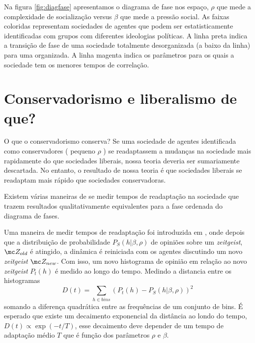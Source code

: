 Na figura \ref{fig:diagfase} apresentamos o diagrama de fase nos espaço, $\rho$
que mede a complexidade de socialização versus $\beta$ que mede a pressão
social. As faixas coloridas representam sociedades de agentes que podem ser
estatisticamente identificadas com grupos com diferentes ideologias políticas. A
linha preta indica a transição de fase de uma sociedade totalmente
desorganizada (a baixo da linha) para uma organizada. A linha magenta indica os
parâmetros para os quais a sociedade tem os menores tempos de correlação. 


\newpage
\section{Conservadorismo e liberalismo de que?} %


O que o conservadorismo conserva? Se uma sociedade de agentes identificada como
conservadores ( pequeno $\rho$ ) se readaptassem a mudanças na sociedade mais
rapidamente do que sociedades liberais, nossa teoria deveria ser sumariamente
descartada. No entanto, o resultado de nossa teoria é que sociedades liberais se
readaptam mais rápido que sociedades conservadoras. 

Existem várias maneiras de se medir tempos de readaptação na sociedade que
trazem resultados qualitativamente equivalentes para a fase ordenada do
diagrama de fases. 

Uma maneira de medir tempos de readaptação foi introduzida em
\citep{Caticha2010}, onde depois que a distribuição de probabilidade
$P_S(h|\beta,\rho)$  de opiniões sobre um \textit{zeitgeist}, $\mc Z_{old}$ é
atingido, a dinâmica é reiniciada com os agentes discutindo um novo
\textit{zeitgeist} $\mc Z_{new}$. Com isso, um novo histograma de
opinião em relação ao novo \textit{zeitgeist} $P_t(h)$ é medido ao longo do
tempo. Medindo a distancia entre os histogramas 
\[
D(t) = \sum_{h\in bins} \left(P_t(h) - P_S(h|\beta,\rho)\right)^2
\]
somando a diferença quadrática entre as frequências de um conjunto de bins.
É esperado que existe um decaimento exponencial da distância ao londo do
tempo, $D(t) \propto \exp(-t/T)$, esse decaimento deve depender de um tempo de
adaptação médio $T$  que é função dos parâmetros $\rho$ e $\beta$. 

